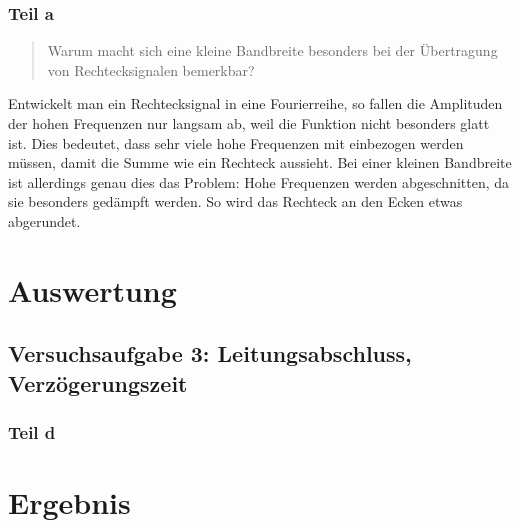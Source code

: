 \subsubsection{Teil a}

\begin{quote}
	Warum macht sich eine kleine Bandbreite besonders bei der Übertragung von
	Rechtecksignalen bemerkbar?
\end{quote}

Entwickelt man ein Rechtecksignal in eine Fourierreihe, so fallen die
Amplituden der hohen Frequenzen nur langsam ab, weil die Funktion nicht
besonders glatt ist. Dies bedeutet, dass sehr viele hohe Frequenzen mit
einbezogen werden müssen, damit die Summe wie ein Rechteck aussieht. Bei einer
kleinen Bandbreite ist allerdings genau dies das Problem: Hohe Frequenzen
werden abgeschnitten, da sie besonders gedämpft werden. So wird das Rechteck an
den Ecken etwas abgerundet.


\section{Auswertung}

\subsection{Versuchsaufgabe 3: Leitungsabschluss, Verzögerungszeit}

\subsubsection{Teil d}


\section{Ergebnis}

\IfFileExists{\bibliographyfile}{
	
}{}



